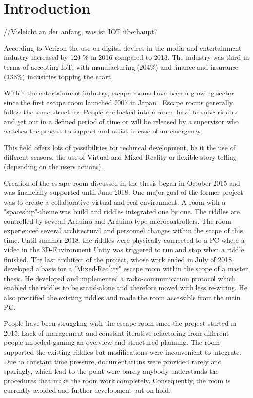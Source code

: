 
\chapter{Introduction} %

\label{Chapter1} %
//Vieleicht an den anfang, was ist IOT überhaupt?

According to Verizon \parencite{verizon} the use on digital devices in the media and entertainment industry increased by 120 \% in 2016 compared to 2013.
The industry was third in terms of accepting IoT,
with manufacturing (204\%) and finance and insurance (138\%) industries topping the chart.

Within the entertainment industry, escape rooms have been a growing sector since the first escape room launched 2007 in Japan \parencite{escapeFirst}.
Escape rooms generally follow the same structure: People are locked into a room, have to solve riddles
and get out in a defined period of time or will be released by a supervisor who watches the process to support
and assist in case of an emergency.

This field offers lots of possibilities for technical development, 
be it the use of different sensors, the use of Virtual and Mixed Reality or flexible story-telling (depending on the users actions).

Creation of the escape room discussed in the thesis began in October 2015 and was financially supported until June 2018.
One major goal of the former project was to create a collaborative virtual and real environment.
A room with a "spaceship"-theme was build and riddles integrated one by one.
The riddles are controlled by several Arduino and Arduino-type microcontrollers.
The room experienced several architectural and personnel changes within the scope of this time. 
Until summer 2018, the riddles were physically connected to a PC where a video in the 3D-Environment Unity was triggered to run and stop when a riddle finished.
The last architect of the project, whose work ended in July of 2018, developed a basis for a "Mixed-Reality" escape room within the scope of a master thesis.
He developed and implemented a radio-communication protocol which enabled the riddles to be stand-alone and therefore moved with less re-wiring.
He also prettified the existing riddles and made the room accessible from the main PC.

People have been struggling with the escape room since the project started in 2015. 
Lack of management and constant iterative refactoring from different people impeded gaining an overview and structured planning.
The room supported the existing riddles but modifications were inconvenient to integrate.
Due to constant time pressure, 
documentations were provided rarely and sparingly, 
which lead to the point were barely anybody understands 
the procedures that make the room work completely. 
Consequently, the room is currently avoided and further development put on hold.

